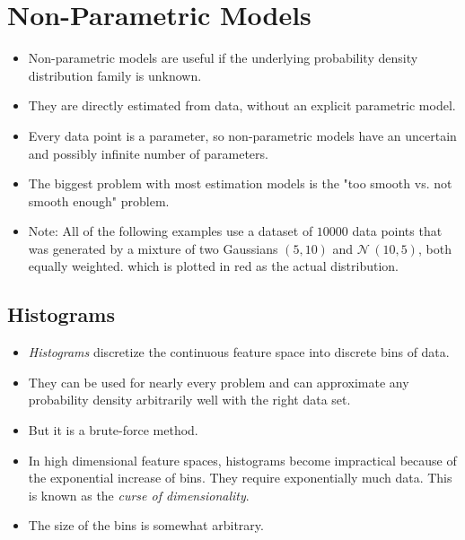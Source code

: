 	\section{Non-Parametric Models}
		\begin{itemize}
			\item Non-parametric models are useful if the underlying probability density distribution family is unknown.
			\item They are directly estimated from data, without an explicit parametric model.
			\item Every data point is a parameter, so non-parametric models have an uncertain and possibly infinite number of parameters.
			\item The biggest problem with most estimation models is the "too smooth vs. not smooth enough" problem.
			\item Note: All of the following examples use a dataset of \(10000\) data points that was generated by a mixture of two Gaussians \(
			(5, 10) \) and \( \mathcal{N}\,(10, 5) \), both equally weighted. which is plotted in red as the actual distribution.
		\end{itemize}

		\subsection{Histograms}
			\begin{itemize}
				\item \emph{Histograms} discretize the continuous feature space into discrete bins of data.
				\item They can be used for nearly every problem and can approximate any probability density arbitrarily well with the right data set.
				\item But it is a brute-force method.
				\item In high dimensional feature spaces, histograms become impractical because of the exponential increase of bins. They require exponentially much data. This is known as the \emph{curse of dimensionality}.
				\item The size of the bins is somewhat arbitrary.
			\end{itemize}

